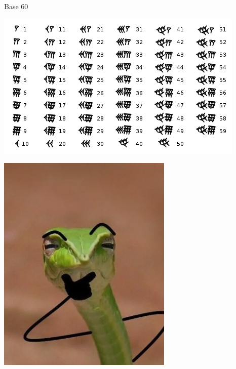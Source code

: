 \vfill
\pagebreak

{\Huge
	Base 60
}
\begin{center}
	\includegraphics[height=.9\textheight]{./IMG/Babylonian_numerals.svg.png}
\end{center}

\vfill
\pagebreak

	\begin{center}
	\includegraphics[height=\textheight]{./IMG/cobra.jpg}
\end{center}

